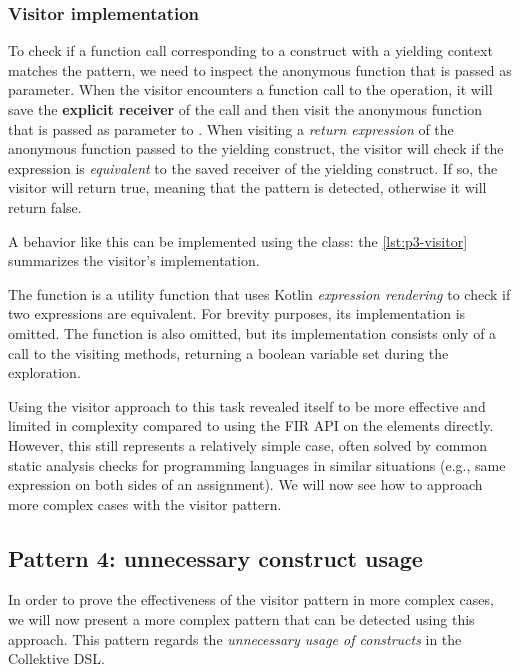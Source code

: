 \documentclass[12pt,a4paper,openright,twoside]{book}
\begin{document}
\subsubsection{Visitor implementation}

To check if a function call corresponding to a construct with a yielding context
matches the pattern, we need to inspect the anonymous function that is passed as
parameter. When the visitor encounters a function call to the 
operation, it will save the \textbf{explicit receiver} of the call and then
visit the anonymous function that is passed as parameter to .
%
When visiting a \emph{return expression} of the anonymous function
passed to the yielding construct, the visitor will check if the expression is
\emph{equivalent} to the saved receiver of the yielding construct.
%
If so, the visitor will return true, meaning that the pattern is detected,
otherwise it will return false. 

A behavior like this can be implemented using the 
class: the \cref{lst:p3-visitor} summarizes the visitor's implementation.



The function  is a utility function that
uses Kotlin \emph{expression rendering} to check if two expressions are 
equivalent. For brevity purposes, its implementation is omitted.
%
The function  is also omitted, but its
implementation consists only of a call to the visiting methods, returning a
boolean variable set during the exploration.

Using the visitor approach to this task revealed itself to be more effective and
limited in complexity compared to using the \ac{FIR} API on the elements
directly. However, this still represents a relatively simple case, often solved
by common static analysis checks for programming languages in similar situations
(e.g., same expression on both sides of an assignment). We will now see how to
approach more complex cases with the visitor pattern.

\subsection{Pattern 4: unnecessary construct usage}

In order to prove the effectiveness of the visitor pattern in more complex cases,
we will now present a more complex pattern that can be detected using this
approach. This pattern regards the \emph{unnecessary usage of constructs} in the
Collektive DSL.
\end{document}
